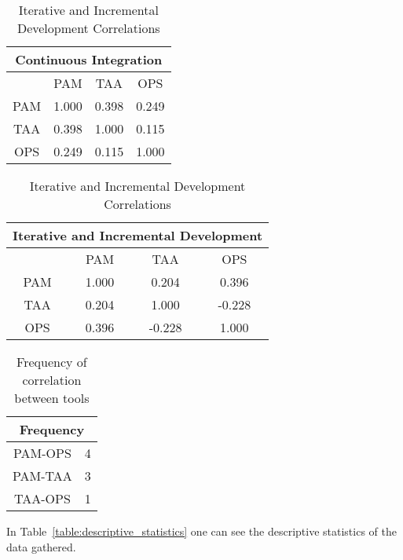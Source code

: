\begin{table}
 \RawFloats %
 \begin{minipage}{.45\textwidth}
  \caption{Continuous Integration Correlations}
  \label{table:ci_correlations}
  \begin{tabular}{| c | c | c | c | } \hline
  \multicolumn{4}{|c|}{\textbf{Continuous Integration}}  \\ \hline
   & PAM & TAA & OPS \\ \hline
  PAM & 1.000 & 0.398 & \cellcolor{green}0.249 \\ \hline
  TAA & 0.398 & 1.000 & 0.115 \\ \hline
  OPS & \cellcolor{green}0.249 & 0.115 & 1.000 \\ \hline
 \end{tabular}
 \end{minipage}%
%
 \begin{minipage}{.45\textwidth}
  \centering
   \caption{Iterative and Incremental Development Correlations}
  \label{table:iid_correlations}
  \begin{tabular}{| c | c | c | c |} \hline
  \multicolumn{4}{|c|}{\textbf{Iterative and Incremental Development}}  \\ \hline
  & PAM & TAA & OPS \\ \hline
  PAM & 1.000 & 0.204 & \cellcolor{green}0.396 \\ \hline
  TAA & 0.204 & 1.000 & -0.228 \\ \hline
  OPS & \cellcolor{green}0.396 & -0.228 & 1.000 \\ \hline
 \end{tabular}
 \end{minipage}%
\end{table}

\begin{table} [H]
	\caption{Frequency of correlation between tools}
	\label{table:correlations_frequency}
	\begin{tabular}{| c | c |} \hline
		\multicolumn{2}{|c|}{\textbf{Frequency}}  \\ \hline
		PAM-OPS & 4 \\ \hline
		PAM-TAA & 3 \\ \hline
		TAA-OPS & 1 \\ \hline
	\end{tabular}
\end{table}


In Table~\ref{table:descriptive_statistics} one can see the descriptive statistics of the data gathered.

